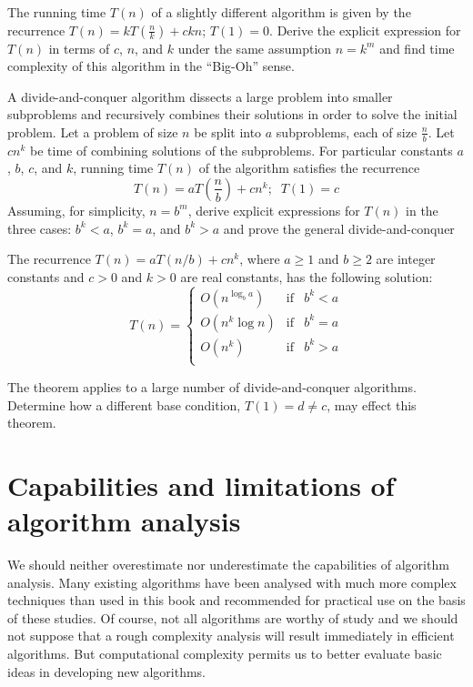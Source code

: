 \begin{Exercise}\label{exr:recur:ckn}
The running time \(T(n)\) of a slightly different algorithm 
is given by the recurrence
\(T(n) = k  T \left ( \frac{n}{k} \right ) + c k n\);
\(T(1) = 0\).
Derive the explicit expression
for $T(n)$ in terms of $c$, $n$, and $k$ under the same
assumption $n = k^{m}$ and find time 
complexity of this algorithm in the ``Big-Oh'' sense.
\end{Exercise}

\begin{Exercise} 
\label{exr:recur:general:dc}

A divide-and-conquer algorithm dissects a large problem into
smaller subproblems and recursively combines their solutions in
order to solve the initial problem.
Let a
problem of size \(n\) be split into \(a\) subproblems,
each of size \(\frac{n}{b}\). Let \(cn^k\) 
be time of combining solutions of the subproblems.
For particular constants \(a\), \(b\), \(c\), and \(k\),
running time \(T(n)\) of the algorithm satisfies the
recurrence
\[
T(n) = aT\left(\frac{n}{b}\right ) + c n^k; \;\; T(1) = c
\]
Assuming, for simplicity,
\(n = b^m\), derive explicit expressions for \(T(n)\) 
in the three cases: \(b^k < a\), \(b^k = a\), and \(b^k > a\)
and prove the general divide-and-conquer 
\begin{theorem}
The recurrence $T(n) = aT(n/b)+cn^k$, where $a\ge 1$ and $b\ge 2$
are integer constants and
$c>0$ and $k>0$ are real constants, has the following solution:
\[
T(n) = \left \{
\begin{array}{lll}
O(n^{\log_b a}) & \mathrm{if} & b^k < a\\
O(n^k \log n)   & \mathrm{if} & b^k = a\\ 
O(n^k )         & \mathrm{if} & b^k > a\\
\end{array}
\right .
\]
\end{theorem}
The theorem applies to a large number of divide-and-conquer
algorithms.
Determine how a different base condition, \(T(1)=d \ne c\), may effect
this theorem.
\end{Exercise}
\fi
 
\section{Capabilities and limitations of algorithm analysis}
\label{sec:capab:limit}

We should neither overestimate nor underestimate the
capabilities of algorithm analysis. Many existing
algorithms have been analysed with  much more
complex techniques than used in this book and recommended 
for practical use on the basis of these studies.
Of course, not all algorithms are worthy of study and
we should not suppose that a rough complexity
analysis will result immediately in efficient algorithms. But
computational complexity permits us to better
evaluate basic ideas in developing new algorithms.

